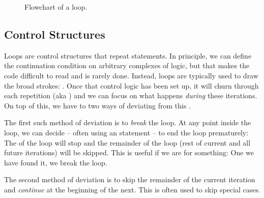 \begin{figure}[tbp]
  
  \caption{Flowchart of a  loop.}
  \label{fig:flow:repetition:for}
\end{figure}

\subsection{Control Structures}

Loops are control structures that repeat statements. In principle, we can define the continuation condition on arbitrary complexes of logic, but that makes the code difficult to read and is rarely done. Instead, loops are typically used to draw the broad strokes: . Once that control logic has been set up, it will churn through each repetition (aka ) and we can focus on what happens \textsl{during} these iterations. On top of this, we have to two ways of deviating from this .

The first such method of deviation is to \textsl{break} the loop. At any point inside the loop, we can decide -- often using an  statement -- to end the loop prematurely: The  of the loop will stop and the remainder of the loop (rest of current and all future iterations) will be skipped. This is useful if we are  for something: One we have found it, we break the loop.

The second method of deviation is to skip the remainder of the current iteration and \textsl{continue} at the beginning of the next. This is often used to skip special cases.

